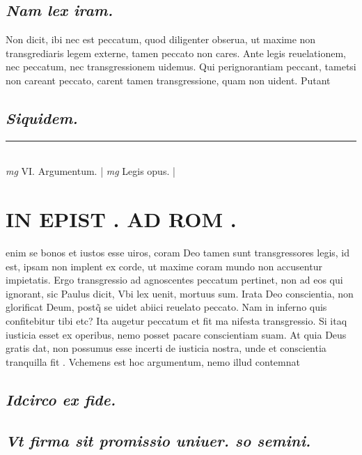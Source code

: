 \documentclass{article}
\begin{document}
\begin{pages}
\subsection*{\textit{Nam lex iram. }}\pstart Non dicit, ibi nec est peccatum, quod diligenter obserua, ut maxime non transgrediaris legem externe, tamen peccato non cares. Ante legis reuelationem, nec peccatum, nec transgressionem uidemus. Qui perignorantiam peccant, tametsi non careant peccato, carent tamen transgressione, quam non uident. Putant  \pend
{}
{}
\subsection*{\textit{Siquidem. }}
\vspace{0.5cm}\noindent
\vspace{0.2cm}\rule{1cm}{0.2pt}\\ 
\hspace{0.2cm}\textit{mg}
\footnotesize VI. Argumentum. 
\normalsize| 
\hspace{0.2cm}\textit{mg}
\footnotesize Legis opus.  
\normalsize| 
\section*{IN EPIST . AD ROM .  }
\marginpar{[ p.42 ]}\pstart enim se bonos et iustos esse uiros, coram Deo tamen sunt transgressores legis, id est, ipsam non implent ex corde, ut maxime coram mundo non accusentur impietatis. Ergo transgressio ad agnoscentes peccatum pertinet, non ad eos qui ignorant, sic Paulus dicit, Vbi lex uenit, mortuus sum.  \pend\pstart Irata Deo conscientia, non glorificat Deum, postq̃ se uidet abiici reuelato peccato. Nam in inferno quis confitebitur tibi etc? Ita augetur peccatum et fit ma nifesta transgressio. Si itaq iusticia esset ex operibus, nemo posset pacare conscientiam suam. At quia Deus gratis dat, non possumus esse incerti de iusticia nostra, unde et conscientia tranquilla fit . Vchemens est hoc argumentum, nemo illud contemnat\pend
{}
{}
\subsection*{\textit{Idcirco ex fide. }}
{}
\subsection*{\textit{Vt firma sit promissio uniuer. so semini. }}
{}

\end{pages}
\end{document}
